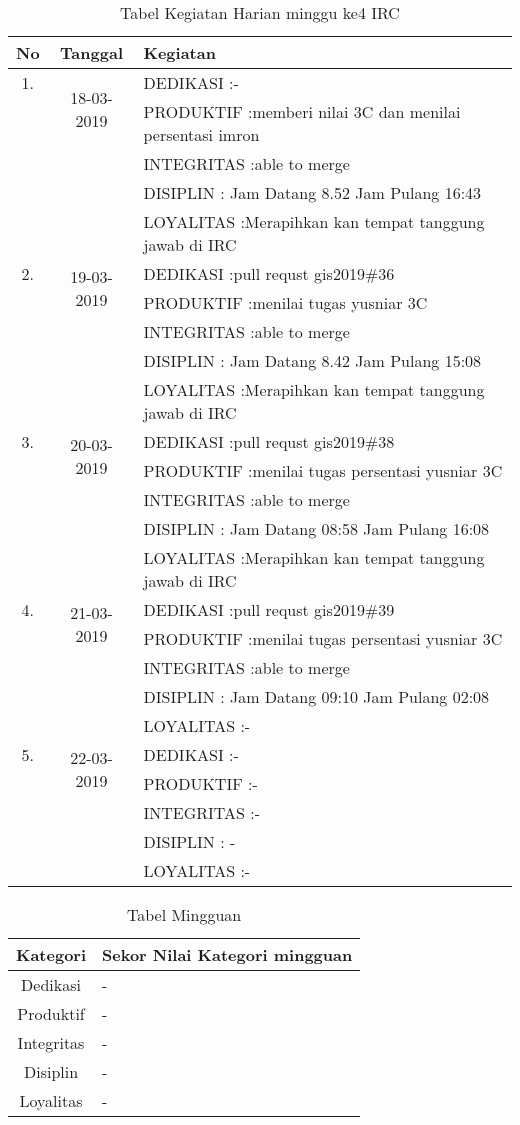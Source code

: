 \begin{table}[h]
\caption{Tabel Kegiatan Harian minggu ke4 IRC}
\centering
\begin{tabular}{|c|c|l|}
\hline
No&Tanggal&Kegiatan\\
\hline
1.&\multirow{2}{*}{18-03-2019}
&DEDIKASI :- \\
&&PRODUKTIF :memberi nilai 3C dan menilai persentasi imron\\
&&INTEGRITAS :able to merge\\
&&DISIPLIN : Jam Datang 8.52 Jam Pulang 16:43\\
&&LOYALITAS :Merapihkan kan tempat tanggung jawab di IRC\\
\hline
2.&\multirow{2}{*}{19-03-2019}
&DEDIKASI :pull requst gis2019\#36\\
&&PRODUKTIF :menilai tugas yusniar 3C\\
&&INTEGRITAS :able to merge\\
&&DISIPLIN : Jam Datang 8.42 Jam Pulang 15:08\\
&&LOYALITAS :Merapihkan kan tempat tanggung jawab di IRC\\
\hline
3.&\multirow{2}{*}{20-03-2019}
&DEDIKASI :pull requst gis2019\#38\\
&&PRODUKTIF :menilai tugas persentasi yusniar 3C\\
&&INTEGRITAS :able to merge\\
&&DISIPLIN : Jam Datang 08:58 Jam Pulang 16:08\\
&&LOYALITAS :Merapihkan kan tempat tanggung jawab di IRC\\
\hline
4.&\multirow{2}{*}{21-03-2019}
&DEDIKASI :pull requst gis2019\#39\\
&&PRODUKTIF :menilai tugas persentasi yusniar 3C\\
&&INTEGRITAS :able to merge\\
&&DISIPLIN : Jam Datang 09:10 Jam Pulang 02:08\\
&&LOYALITAS :-\\
\hline
5.&\multirow{2}{*}{22-03-2019}
&DEDIKASI :-\\
&&PRODUKTIF :-\\
&&INTEGRITAS :-\\
&&DISIPLIN : -\\
&&LOYALITAS :-\\
\hline
\end{tabular}
\label{table:contoh}
\end{table}

\begin{table}[h]
\begin{center}
\caption{Tabel Mingguan}
\begin{tabular}{|c|l|}
\hline
Kategori& Sekor Nilai Kategori mingguan\\
\hline
Dedikasi & -\\
\hline
Produktif & -\\
\hline
Integritas & -\\
\hline
Disiplin & -\\
\hline
Loyalitas & -\\
\hline
\end{tabular}
\end{center}
\label {Tabel:contoh} 
\end{table}

